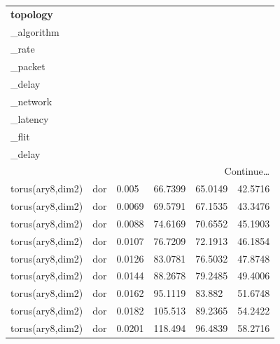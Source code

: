 \begin{longtable}[H]{llllll}
\textbf{topology} &
  \textbf{\begin{tabular}[c]{@{}l@{}}routing\\ \_algorithm\end{tabular}} &
  \textbf{\begin{tabular}[c]{@{}l@{}}injection\\ \_rate\end{tabular}} &
  \textbf{\begin{tabular}[c]{@{}l@{}}average\\ \_packet\\ \_delay\end{tabular}} &
  \textbf{\begin{tabular}[c]{@{}l@{}}average\\ \_network\\ \_latency\end{tabular}} &
  \textbf{\begin{tabular}[c]{@{}l@{}}average\\ \_flit\\ \_delay\end{tabular}} \\ \hline
\endhead %
\hline
\multicolumn{6}{r}{Continue…}\\
\endfoot %
\hline
\endlastfoot%
torus(ary8,dim2) & dor        & 0.005                          & 66.7399 & 65.0149 & 42.5716 \\
torus(ary8,dim2) & dor        & 0.0069                         & 69.5791 & 67.1535 & 43.3476 \\
torus(ary8,dim2) & dor        & 0.0088                         & 74.6169 & 70.6552 & 45.1903 \\
torus(ary8,dim2) & dor        & 0.0107                         & 76.7209 & 72.1913 & 46.1854 \\
torus(ary8,dim2) & dor        & 0.0126                         & 83.0781 & 76.5032 & 47.8748 \\
torus(ary8,dim2) & dor        & 0.0144                         & 88.2678 & 79.2485 & 49.4006 \\
torus(ary8,dim2) & dor        & 0.0162                         & 95.1119 & 83.882  & 51.6748 \\
torus(ary8,dim2) & dor        & 0.0182                         & 105.513 & 89.2365 & 54.2422 \\
torus(ary8,dim2) & dor        & 0.0201                         & 118.494 & 96.4839 & 58.2716 \\

\end{longtable}
